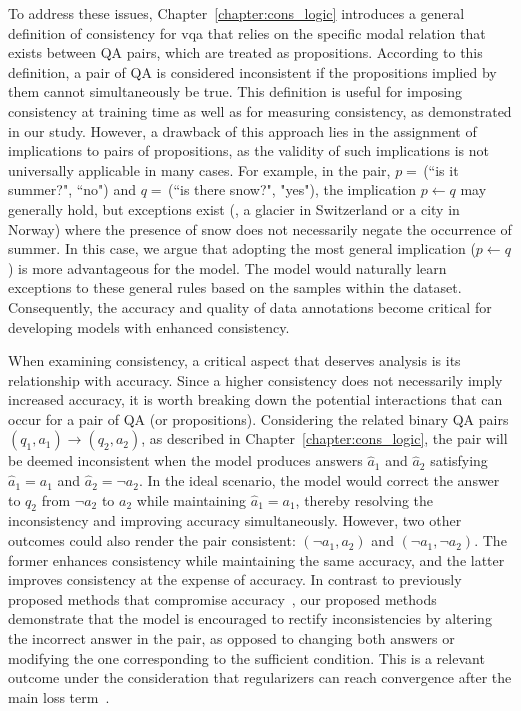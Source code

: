 To address these issues, Chapter~\ref{chapter:cons_logic} introduces a general definition of consistency for \gls{vqa} that relies on the specific modal relation that exists between QA pairs, which are treated as propositions. According to this definition, a pair of QA is considered inconsistent if the propositions implied by them cannot simultaneously be true. This definition is useful for imposing consistency at training time as well as for measuring consistency, as demonstrated in our study. However, a drawback of this approach lies in the assignment of implications to pairs of propositions, as the validity of such implications is not universally applicable in many cases. For example, in the pair, $p= \,$(``is it summer?", ``no") and $q= \,$(``is there snow?", "yes"), the implication $p \leftarrow q$ may generally hold, but exceptions exist (\eg, a glacier in Switzerland or a city in Norway) where the presence of snow does not necessarily negate the occurrence of summer. In this case, we argue that adopting the most general implication ($p \leftarrow q$) is more advantageous for the model. The model would naturally learn exceptions to these general rules based on the samples within the dataset. Consequently, the accuracy and quality of data annotations become critical for developing models with enhanced consistency.

When examining consistency, a critical aspect that deserves analysis is its relationship with accuracy. Since a higher consistency does not necessarily imply increased accuracy, it is worth breaking down the potential interactions that can occur for a pair of QA (or propositions). Considering the related binary QA pairs $(q_1, a_1) \rightarrow (q_2, a_2)$, as described in Chapter~\ref{chapter:cons_logic}, the pair will be deemed inconsistent when the model produces answers $\hat{a}_1$ and $\hat{a}_2$ satisfying $\hat{a}_1 = a_1$ and $\hat{a}_2 = \neg a_2$. In the ideal scenario, the model would correct the answer to $q_2$ from $\neg a_2$ to $a_2$ while maintaining $\hat{a}_1 = a_1$, thereby resolving the inconsistency and improving accuracy simultaneously. However, two other outcomes could also render the pair consistent: $(\neg a_1, a_2)$ and $(\neg a_1, \neg a_2)$. The former enhances consistency while maintaining the same accuracy, and the latter improves consistency at the expense of accuracy. In contrast to previously proposed methods that compromise accuracy~\cite{selvaraju2020squinting,ribeiro2019red,goel2021iq}, our proposed methods demonstrate that the model is encouraged to rectify inconsistencies by altering the incorrect answer in the pair, as opposed to changing both answers or modifying the one corresponding to the sufficient condition. This is a relevant outcome under the consideration that regularizers can reach convergence after the main loss term~\cite{teney2019incorporating}. 


